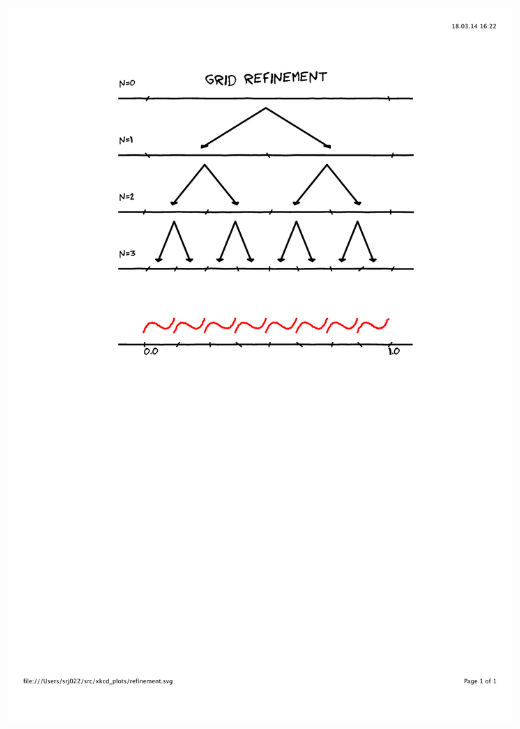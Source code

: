 \begin{frame}
\begin{columns}
\begin{column}[b]{0.35\linewidth}
{        \includegraphics[scale=0.30, clip, viewport=100 400 500 800] {figures/refinement.pdf}
        \vspace{3mm}
    }
\end{column}
\end{columns}
\end{frame}
